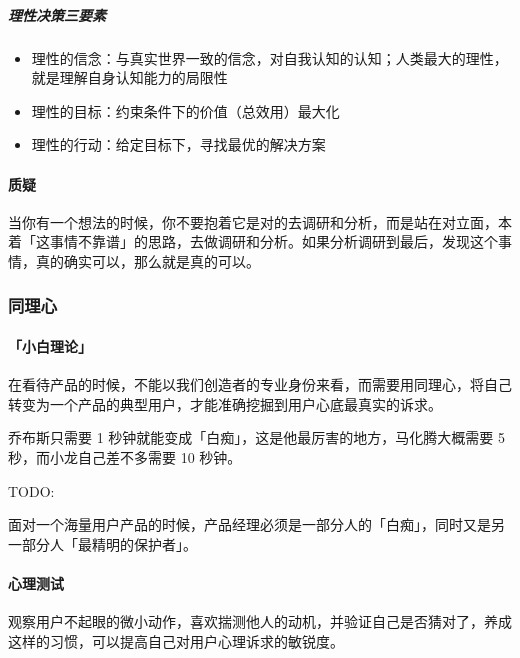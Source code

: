 \documentclass[letterpaper,11pt,english]{sphinxmanual}
\begin{document}
\subparagraph{理性决策三要素}
\label{\detokenize{chapter_idea/idea:id8}}\begin{itemize}
\item {} 
理性的信念：与真实世界一致的信念，对自我认知的认知；人类最大的理性，就是理解自身认知能力的局限性

\item {} 
理性的目标：约束条件下的价值（总效用）最大化

\item {} 
理性的行动：给定目标下，寻找最优的解决方案

\end{itemize}


\paragraph{质疑}
\label{\detokenize{chapter_idea/idea:id9}}
当你有一个想法的时候，你不要抱着它是对的去调研和分析，而是站在对立面，本着「这事情不靠谱」的思路，去做调研和分析。如果分析调研到最后，发现这个事情，真的确实可以，那么就是真的可以。%
\begin{footnote}[307]\sphinxAtStartFootnote
{}
%
\end{footnote}


\subsubsection{同理心}
\label{\detokenize{chapter_idea/empathy:id1}}\label{\detokenize{chapter_idea/empathy::doc}}

\paragraph{「小白理论」}
\label{\detokenize{chapter_idea/empathy:id2}}
在看待产品的时候，不能以我们创造者的专业身份来看，而需要用同理心，将自己转变为一个产品的典型用户，才能准确挖掘到用户心底最真实的诉求。

乔布斯只需要 1 秒钟就能变成「白痴」，这是他最厉害的地方，马化腾大概需要
5 秒，而小龙自己差不多需要 10 秒钟。

TODO:

面对一个海量用户产品的时候，产品经理必须是一部分人的「白痴」，同时又是另一部分人「最精明的保护者」。


\paragraph{心理测试}
\label{\detokenize{chapter_idea/empathy:id3}}
观察用户不起眼的微小动作，喜欢揣测他人的动机，并验证自己是否猜对了，养成这样的习惯，可以提高自己对用户心理诉求的敏锐度。
\end{document}
